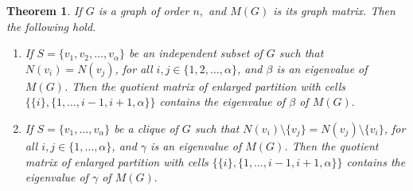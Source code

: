 \documentclass[12pt,twoside]{article}
\newtheorem{theorem}{Theorem}[section]
\begin{document}
\begin{theorem}\label{end}
	If $G$ is a graph of order $n,$ and $M(G)$ is its graph matrix. Then the following hold.
	\begin{enumerate}
		\item If $ S=\{v_{1}, v_{2},\dots, v_{\alpha}\} $ be an independent subset of $ G $ such that $ N(v_{i})=N(v_{j})$, for all $ i,j\in \{1,2,\dots,\alpha \} $, and $\beta$ is an eigenvalue of $M(G)$. Then the quotient matrix of enlarged partition with cells $\{\{i\}, \{1,\dots,i-1,i+1, \alpha\}\}$ contains the eigenvalue of $\beta$ of $M(G).$
	\item  If $ S=\{v_{1}, \dots, v_{\alpha}\} $ be a clique of $ G $ such that $ N(v_{i}) \setminus \{v_{j}\}=N(v_{j})\setminus \{v_{i}\}$, for all $ i,j\in \{1,\dots,\alpha \} $, and $\gamma$ is an eigenvalue of $M(G)$. Then the quotient matrix of enlarged partition with cells $\{\{i\}, \{1,\dots,i-1,i+1, \alpha\}\}$ contains the eigenvalue of $\gamma$ of $M(G).$
	\end{enumerate}
\end{theorem}
\end{document}
